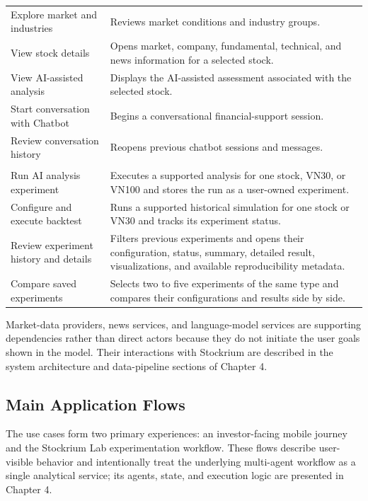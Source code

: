 {\begin{longtable}{>{\raggedright\arraybackslash}m{5.1cm} >{\raggedright\arraybackslash}m{8.7cm}}
    Explore market and industries & Reviews market conditions and industry groups. \\
    View stock details & Opens market, company, fundamental, technical, and news information for a selected stock. \\
    View AI-assisted analysis & Displays the AI-assisted assessment associated with the selected stock. \\
    Start conversation with Chatbot & Begins a conversational financial-support session. \\
    Review conversation history & Reopens previous chatbot sessions and messages. \\
    \midrule
    \multicolumn{2}{l}{\textbf{Stockrium Lab web workspace}} \\
    Run AI analysis experiment & Executes a supported analysis for one stock, VN30, or VN100 and stores the run as a user-owned experiment. \\
    Configure and execute backtest & Runs a supported historical simulation for one stock or VN30 and tracks its experiment status. \\
    Review experiment history and details & Filters previous experiments and opens their configuration, status, summary, detailed result, visualizations, and available reproducibility metadata. \\
    Compare saved experiments & Selects two to five experiments of the same type and compares their configurations and results side by side. \\
\end{longtable}
}

Market-data providers, news services, and language-model services are supporting dependencies rather than direct actors because they do not initiate the user goals shown in the model. Their interactions with Stockrium are described in the system architecture and data-pipeline sections of Chapter 4.

\subsection{Main Application Flows}
\label{subsec:main-application-flows}

The use cases form two primary experiences: an investor-facing mobile journey and the Stockrium Lab experimentation workflow. These flows describe user-visible behavior and intentionally treat the underlying multi-agent workflow as a single analytical service; its agents, state, and execution logic are presented in Chapter 4.

